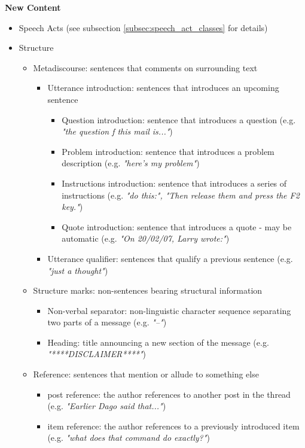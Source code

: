 \documentclass[11pt]{article}
\begin{document}
\textbf{New Content}
\begin{itemize}
	\item Speech Acts (see subsection \ref{subsec:speech_act_classes} for details)
	\item Structure
		\begin{itemize}
			\item Metadiscourse: sentences that comments on surrounding text
				\begin{itemize}
					\item Utterance introduction: sentences that introduces an upcoming sentence
						\begin{itemize}
							\item Question introduction: sentence that introduces a question (e.g. \textit{"the question f this mail is..."})
							\item Problem introduction: sentence that introduces a problem description (e.g. \textit{"here's my problem"})
							\item Instructions introduction: sentence that introduces a series of instructions (e.g. \textit{"do this:", "Then release them and press the F2 key."})
							\item Quote introduction: sentence that introduces a quote - may be automatic (e.g. \textit{"On 20/02/07, Larry wrote:"})
						\end{itemize}
					\item Utterance qualifier: sentences that qualify a previous sentence (e.g. \textit{"just a thought"})
				\end{itemize}
			\item Structure marks: non-sentences bearing structural information
				\begin{itemize}
					\item Non-verbal separator: non-linguistic character sequence separating two parts of a message (e.g. \textit{"--"})
					\item Heading: title announcing a new section of the message (e.g. \textit{"****DISCLAIMER****"})
				\end{itemize}
			\item Reference: sentences that mention or allude to something else
				\begin{itemize}
					\item post reference: the author references to another post in the thread (e.g. \textit{"Earlier Dago said that..."})
					\item item reference: the author references to a previously introduced item (e.g. \textit{"what does that command do exactly?"})

\end{itemize}
\end{itemize}
\end{itemize}
\end{document}
